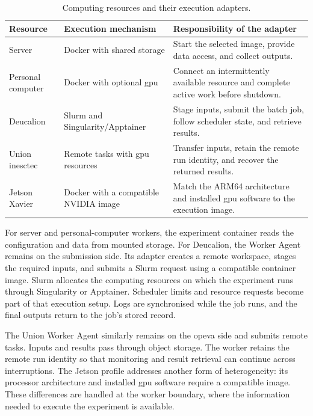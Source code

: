 \begin{table}[htbp]
\centering
\caption{Computing resources and their execution adapters.}
\label{tab:lifecycle-targets}
\small
\renewcommand{\arraystretch}{1.12}
\begin{tabularx}{\textwidth}{@{}>{\raggedright\arraybackslash}p{}>{\raggedright\arraybackslash}p{}>{\raggedright\arraybackslash}X@{}}
\toprule
\textbf{Resource} & \textbf{Execution mechanism} & \textbf{Responsibility of the adapter} \\
\midrule
Server & Docker with shared storage & Start the selected image, provide data access, and collect outputs. \\
Personal computer & Docker with optional \gls{gpu} & Connect an intermittently available resource and complete active work before shutdown. \\
Deucalion & Slurm and Singularity/Apptainer & Stage inputs, submit the batch job, follow scheduler state, and retrieve results. \\
Union \gls{inesctec} & Remote tasks with \gls{gpu} resources & Transfer inputs, retain the remote run identity, and recover the returned results. \\
Jetson Xavier & Docker with a compatible NVIDIA image & Match the ARM64 architecture and installed \gls{gpu} software to the execution image. \\
\bottomrule
\end{tabularx}
\end{table}

For server and personal-computer workers, the experiment container reads the configuration and data from mounted storage. For Deucalion, the Worker Agent remains on the submission side. Its adapter creates a remote workspace, stages the required inputs, and submits a Slurm request using a compatible container image. Slurm allocates the computing resources on which the experiment runs through Singularity or Apptainer. Scheduler limits and resource requests become part of that execution setup. Logs are synchronised while the job runs, and the final outputs return to the job's stored record.

The Union Worker Agent similarly remains on the \gls{opeva} side and submits remote tasks. Inputs and results pass through object storage. The worker retains the remote run identity so that monitoring and result retrieval can continue across interruptions. The Jetson profile addresses another form of heterogeneity: its processor architecture and installed \gls{gpu} software require a compatible image. These differences are handled at the worker boundary, where the information needed to execute the experiment is available.

